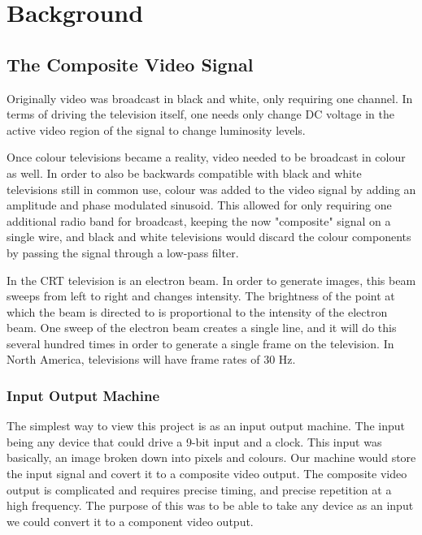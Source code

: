 \section{Background}

\subsection{The Composite Video Signal}

Originally video was broadcast in black and white, only requiring one channel.
In terms of driving the television itself, one needs only change DC voltage in
the active video region of the signal to change luminosity levels.

Once colour televisions became a reality, video needed to be broadcast in colour
as well. In order to also be backwards compatible with black and white
televisions still in common use, colour was added to the video signal by adding
an amplitude and phase modulated sinusoid. This allowed for only requiring one
additional radio band for broadcast, keeping the now "composite" signal on a
single wire, and black and white televisions would discard the colour components
by passing the signal through a low-pass filter.

In the CRT television is an electron beam. In order to generate images, this
beam sweeps from left to right and changes intensity. The brightness of the
point at which the beam is directed to is proportional to the intensity of the
electron beam. One sweep of the electron beam creates a single line, and it will
do this several hundred times in order to generate a single frame on the
television. In North America, televisions will have frame rates of 30 Hz.

\subsubsection{Input Output Machine}

The simplest way to view this project is as an input output machine. The input
being any device that could drive a 9-bit input and a clock. This input was 
basically, an image broken down into pixels and colours. Our machine would 
store the input signal and covert it to a composite video output. The composite
video output is complicated and requires precise timing, and precise repetition 
at a high frequency. The purpose of this was to be able to take any device as 
an input we could convert it to a component video output.

